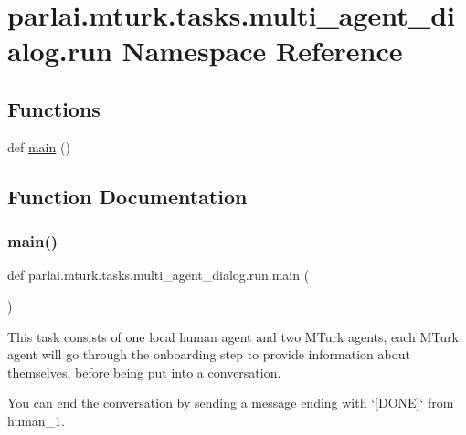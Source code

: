 \hypertarget{namespaceparlai_1_1mturk_1_1tasks_1_1multi__agent__dialog_1_1run}{}\section{parlai.\+mturk.\+tasks.\+multi\+\_\+agent\+\_\+dialog.\+run Namespace Reference}
\label{namespaceparlai_1_1mturk_1_1tasks_1_1multi__agent__dialog_1_1run}
\subsection*{Functions}
\begin{DoxyCompactItemize}
\item 
def \hyperlink{namespaceparlai_1_1mturk_1_1tasks_1_1multi__agent__dialog_1_1run_ab60f6ad04de7f9c7192cdaec99b441d9}{main} ()
\end{DoxyCompactItemize}


\subsection{Function Documentation}
\mbox{\label{namespaceparlai_1_1mturk_1_1tasks_1_1multi__agent__dialog_1_1run_ab60f6ad04de7f9c7192cdaec99b441d9}} 
\subsubsection{\texorpdfstring{main()}{main()}}
{\footnotesize\ttfamily def parlai.\+mturk.\+tasks.\+multi\+\_\+agent\+\_\+dialog.\+run.\+main (\begin{DoxyParamCaption}{ }\end{DoxyParamCaption})}

\begin{DoxyVerb}This task consists of one local human agent and two MTurk agents, each MTurk agent
will go through the onboarding step to provide information about themselves, before
being put into a conversation.

You can end the conversation by sending a message ending with `[DONE]` from human_1.
\end{DoxyVerb}
 